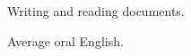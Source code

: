 \begin{cventries}
  \cventry
    {}
    {}
    {}
    {}
    {
      \begin{cvitems}
        \item {Writing and reading documents.}
        \item {Average oral English.}
      \end{cvitems}
    }
\end{cventries}
